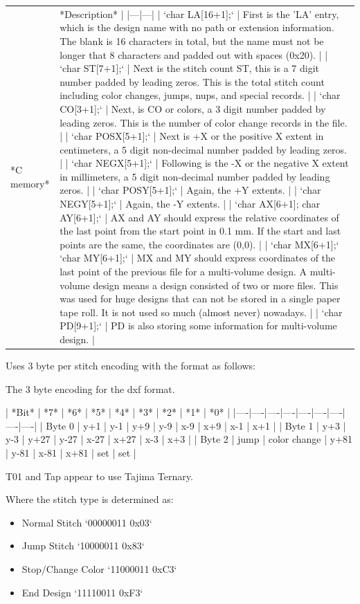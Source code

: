 \documentclass{report}
\begin{document}
\begin{tabular}{l l}
 *C memory* & *Description* |
|---|---|
| `char LA[16+1];` | First is the 'LA' entry, which is the design name with no path or extension information. The blank is 16 characters in total, but the name must not be longer that 8 characters and padded out with spaces (0x20). |
| `char ST[7+1];` | Next is the stitch count ST, this is a 7 digit number padded by leading zeros. This is the total stitch count including color changes, jumps, nups, and special records. |
| `char CO[3+1];` | Next, is CO or colors, a 3 digit number padded by leading zeros. This is the number of color change records in the file. |
| `char POSX[5+1];` | Next is +X or the positive X extent in centimeters, a 5 digit non-decimal number padded by leading zeros. |
| `char NEGX[5+1];` | Following is the -X or the negative X extent in millimeters, a 5 digit non-decimal number padded by leading zeros. |
| `char POSY[5+1];` | Again, the +Y extents. |
| `char NEGY[5+1];` | Again, the -Y extents. |
| `char AX[6+1]; char AY[6+1];` | AX and AY should express the relative coordinates of the last point from the start point in 0.1 mm. If the start and last points are the same, the coordinates are (0,0). |
| `char MX[6+1];` `char MY[6+1];` | MX and MY should express coordinates of the last point of the previous file for a multi-volume design. A multi-volume design means a design consisted of two or more files. This was used for huge designs that can not be stored in a single paper tape roll. It is not used so much (almost never) nowadays. |
| `char PD[9+1];` | PD is also storing some information for multi-volume design. |
\end{tabular}

Uses 3 byte per stitch encoding with the format as follows:

The 3 byte encoding for the dxf format.

| *Bit* | *7* | *6* | *5* | *4* | *3* | *2* | *1* | *0* |
|----|----|----|----|----|----|----|----|----|
| Byte 0 | y+1 | y-1 | y+9 | y-9 | x-9 | x+9 | x-1 | x+1 |
| Byte 1 | y+3 | y-3 | y+27 | y-27 | x-27 | x+27 | x-3 | x+3 |
| Byte 2 | jump | color change | y+81 | y-81 | x-81 | x+81 | set | set |

T01 and Tap appear to use Tajima Ternary.
 
Where the stitch type is determined as:

\begin{itemize}
\item Normal Stitch `00000011 0x03`
\item Jump Stitch `10000011 0x83`
\item Stop/Change Color `11000011 0xC3`
\item End Design `11110011 0xF3`
\end{itemize}
\end{document}
